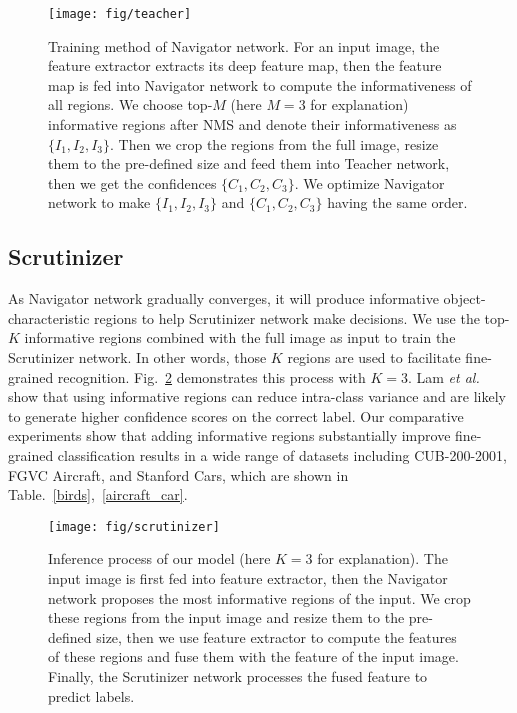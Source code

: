 \documentclass[runningheads]{llncs}
\begin{document}
\begin{figure}[ht]
\begin{center}
\texttt{[image: fig/teacher]}
\end{center}
   \caption{Training method of Navigator network. For an input image, the feature extractor extracts its deep feature map, then the feature map is fed into Navigator network to compute the informativeness of all regions. We choose top-$M$ (here $M=3$ for explanation) informative regions after NMS and denote their informativeness as $\{I_1, I_2, I_3\}$. Then we crop the regions from the full image, resize them to the pre-defined size and feed them into Teacher network, then we get the confidences $\{C_1, C_2, C_3\}$. We optimize Navigator network to make $\{I_1, I_2, I_3\}$ and $\{C_1, C_2, C_3\}$ having the same order.}
\label{teacher}
\end{figure}

\subsection{Scrutinizer}\label{sec_scrutinizer}
As Navigator network gradually converges, it will produce informative object-characteristic regions to help Scrutinizer network make decisions. We use the top-$K$ informative regions combined with the full image as input to train the Scrutinizer network. In other words,  those $K$ regions are used to facilitate fine-grained recognition. Fig.~\ref{scrutinizer} demonstrates this process with $K=3$. Lam \emph{et al.}~\cite{Lam_2017_CVPR} show that using informative regions can reduce intra-class variance and are likely to generate higher confidence scores on the correct label. Our comparative experiments show that adding informative regions substantially improve fine-grained classification results in a wide range of datasets including CUB-200-2001, FGVC Aircraft, and Stanford Cars, which are shown in Table.~\ref{birds},~\ref{aircraft_car}.

\begin{figure}[ht]
\begin{center}
\texttt{[image: fig/scrutinizer]}
\end{center}
   \caption{Inference process of our model (here $K=3$ for explanation). The input image is first fed into feature extractor, then the Navigator network proposes the most informative regions of the input. We crop these regions from the input image and resize them to the pre-defined size, then we use feature extractor to compute the features of these regions and fuse them with the feature of the input image. Finally, the Scrutinizer network processes the fused feature to predict labels.}
\label{scrutinizer}
\end{figure}
\end{document}
